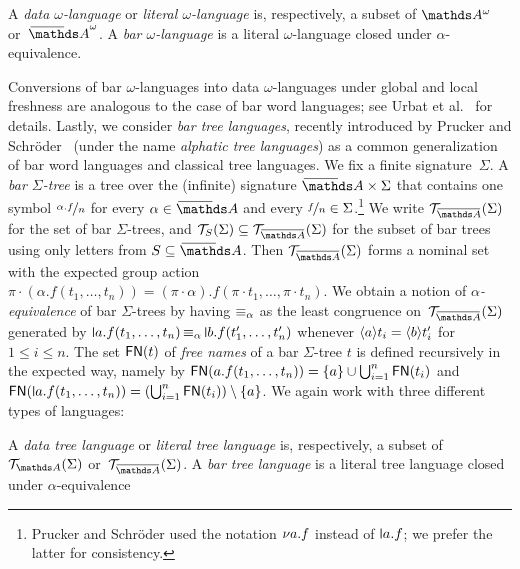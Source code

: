 \documentclass[a4paper,UKenglish,cleveref,autoref,thm-restate,numberwithinsect,final]{lipics-v2021}
\begin{document}
    \begin{defn}
        A \emph{data $\omega$-language} or \emph{literal $\omega$-language} is, respectively, a subset of $\Atw$ or~$\barAw$.
        A \emph{bar $\omega$-language} is a literal $\omega$-language closed under $\alpha$-equivalence.
    \end{defn}

Conversions of bar $\omega$-languages into data $\omega$-languages under global and local freshness are analogous to the case of
    bar word languages; see Urbat et al.~\cite{uhms21} for details.
     Lastly, we consider \emph{bar tree
    languages}, recently introduced by Prucker and Schröder~\cite{ps24} (under the name \emph{alphatic tree languages}) as
    a common generalization of bar word languages and classical tree languages. We fix a finite {signature}~$\Sigma$. A \emph{bar $\Sigma$-tree} is a tree over the (infinite) signature $\barNames\times \Sigma$ that contains one symbol $\nicefrac{\alpha.f}{n}$ for every $\alpha\in\barNames$ and every $\nicefrac{f}{n}\in \Sigma$.\footnote{Prucker and Schröder
    used the notation ${\nu}a.f$ instead of $\newletter{a}.f$; we prefer the latter for consistency.} We write $\bartree(\Sigma)$ for the set of {bar} {$\Sigma$-trees}, and $\bartree[S](\Sigma)\seq \bartree(\Sigma)$ for the subset of bar trees using only letters from $S\seq \barNames$. Then $\bartree(\Sigma)$ forms a nominal set with the expected group action
    $\pi \cdot (\alpha.f(t_1, \dots, t_n)) = (\pi \cdot \alpha).f(\pi\cdot t_1, \dots, \pi\cdot t_n)$.
    We obtain a notion of \emph{$\alpha$-equivalence} of bar $\Sigma$-trees by having $\operatorname{\equiv_{\alpha}}$ as
    the least congruence on~$\bartree(\Sigma)$ generated by $\newletter{a}.f(t_1, \dots, t_n) \alphaequiv \newletter{b}.f(t_1',
    \dots, t_n')$ whenever $\langle a \rangle t_i = \langle b \rangle t_i'$ for $1 \leqslant i \leqslant n$.
    The set $\mathsf{FN}(t)$ of \emph{free names} of a bar $\Sigma$-tree $t$ is defined recursively in the expected way,
    namely by $\mathsf{FN}(a.f(t_1, \dots, t_n)) = \{a\} \cup \bigcup_{i = 1}^n \mathsf{FN}(t_i)$ and
    $\FN(\newletter{a}.f(t_1, \dots, t_n)) = \left(\bigcup_{i = 1}^n \FN(t_i)\right) \setminus \set{a}$.
  We again work with three different types of languages:

    
    \begin{defn}
        A \emph{data tree language} or \emph{literal tree language} is, respectively, a subset of~$\bartree[\names](\Sigma)$ or~$\bartree(\Sigma)$.        
        A \emph{bar tree language} is a literal tree language closed under $\alpha$-equivalence
    \end{defn}
\end{document}
